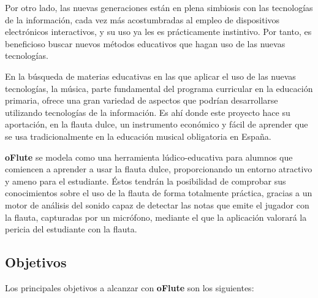 \documentclass[a4paper,11pt]{article}
\begin{document}
Por otro lado, las nuevas generaciones están en plena simbiosis con las
tecnologías de la información, cada vez más acostumbradas al empleo de
dispositivos electrónicos interactivos, y su uso ya les es prácticamente
instintivo. Por tanto, es beneficioso buscar nuevos métodos educativos que hagan
uso de las nuevas tecnologías.

En la búsqueda de materias educativas en las que aplicar el uso de las nuevas
tecnologías, la música, parte fundamental del programa curricular en la
educación primaria, ofrece una gran variedad de aspectos que podrían
desarrollarse utilizando tecnologías de la información. Es ahí donde este
proyecto hace su aportación, en la flauta dulce, un instrumento económico y
fácil de aprender que se usa tradicionalmente en la educación musical
obligatoria en España.

\textbf{oFlute} se modela como una herramienta lúdico-educativa para alumnos que
comiencen a aprender a usar la flauta dulce, proporcionando un entorno atractivo
y ameno para el estudiante. Éstos tendrán la posibilidad de comprobar sus
conocimientos sobre el uso de la flauta de forma totalmente práctica, gracias a
un motor de análisis del sonido capaz de detectar las notas que emite el jugador
con la flauta, capturadas por un micrófono, mediante el que la aplicación
valorará la pericia del estudiante con la flauta.

\subsection{Objetivos}
Los principales objetivos a alcanzar con \textbf{oFlute} son los siguientes:
\end{document}
